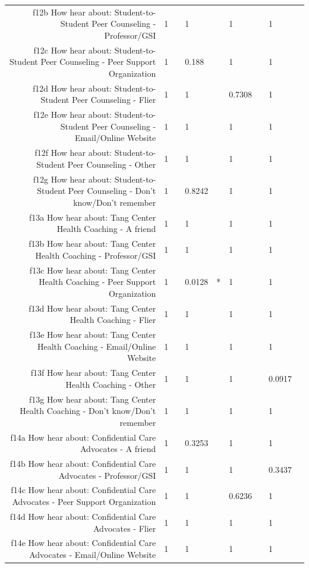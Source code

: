 \documentclass{article}\usepackage[]{graphicx}\usepackage[]{color}
\begin{document}
\begin{table}[ht]
{\begin{tabular}{rllllllll}
  f12b How hear about: Student-to-Student Peer Counseling - Professor/GSI & 1 &   & 1 &   & 1 &   & 1 &   \\ 
  f12c How hear about: Student-to-Student Peer Counseling - Peer Support Organization & 1 &   & 0.188 &   & 1 &   & 1 &   \\ 
  f12d How hear about: Student-to-Student Peer Counseling - Flier & 1 &   & 1 &   & 0.7308 &   & 1 &   \\ 
  f12e How hear about: Student-to-Student Peer Counseling - Email/Online Website & 1 &   & 1 &   & 1 &   & 1 &   \\ 
  f12f How hear about: Student-to-Student Peer Counseling - Other & 1 &   & 1 &   & 1 &   & 1 &   \\ 
  f12g How hear about: Student-to-Student Peer Counseling - Don't know/Don't remember & 1 &   & 0.8242 &   & 1 &   & 1 &   \\ 
  f13a How hear about: Tang Center Health Coaching - A friend & 1 &   & 1 &   & 1 &   & 1 &   \\ 
  f13b How hear about: Tang Center Health Coaching - Professor/GSI & 1 &   & 1 &   & 1 &   & 1 &   \\ 
  f13c How hear about: Tang Center Health Coaching - Peer Support Organization & 1 &   & 0.0128 & * & 1 &   & 1 &   \\ 
  f13d How hear about: Tang Center Health Coaching - Flier & 1 &   & 1 &   & 1 &   & 1 &   \\ 
  f13e How hear about: Tang Center Health Coaching - Email/Online Website & 1 &   & 1 &   & 1 &   & 1 &   \\ 
  f13f How hear about: Tang Center Health Coaching - Other & 1 &   & 1 &   & 1 &   & 0.0917 &   \\ 
  f13g How hear about: Tang Center Health Coaching - Don't know/Don't remember & 1 &   & 1 &   & 1 &   & 1 &   \\ 
  f14a How hear about: Confidential Care Advocates - A friend & 1 &   & 0.3253 &   & 1 &   & 1 &   \\ 
  f14b How hear about: Confidential Care Advocates - Professor/GSI & 1 &   & 1 &   & 1 &   & 0.3437 &   \\ 
  f14c How hear about: Confidential Care Advocates - Peer Support Organization & 1 &   & 1 &   & 0.6236 &   & 1 &   \\ 
  f14d How hear about: Confidential Care Advocates - Flier & 1 &   & 1 &   & 1 &   & 1 &   \\ 
  f14e How hear about: Confidential Care Advocates - Email/Online Website & 1 &   & 1 &   & 1 &   & 1 &   \\ 

\end{tabular}}
\end{table}
\end{document}
